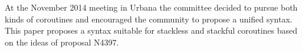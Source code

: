 At the November 2014 meeting in Urbana the committee decided to pursue both
kinds of coroutines and encouraged the community to propose a unified
syntax.\\
This paper proposes a syntax suitable for stackless and stackful coroutines
based on the ideas of proposal N4397\cite{N4397}.
